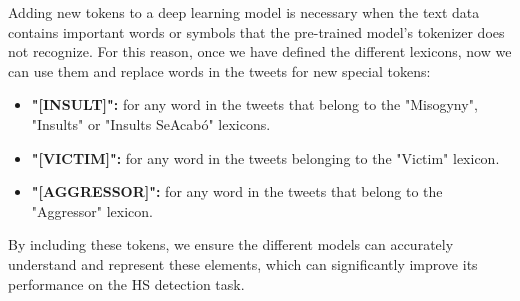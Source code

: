 
Adding new tokens to a deep learning model is necessary when the text data contains important words or symbols that the pre-trained model's tokenizer does not recognize. For this reason, once we have defined the different lexicons, now we can use them and replace words in the tweets for new special tokens:
\begin{itemize}
    \item \textbf{"[INSULT]":} for any word in the tweets that belong to the "Misogyny", "Insults" or "Insults SeAcabó" lexicons.
    \item \textbf{"[VICTIM]":} for any word in the tweets belonging to the "Victim" lexicon.
    \item \textbf{"[AGGRESSOR]":} for any word in the tweets that belong to the "Aggressor" lexicon.
\end{itemize}

By including these tokens, we ensure the different models can accurately understand and represent these elements, which can significantly improve its performance on the HS detection task.